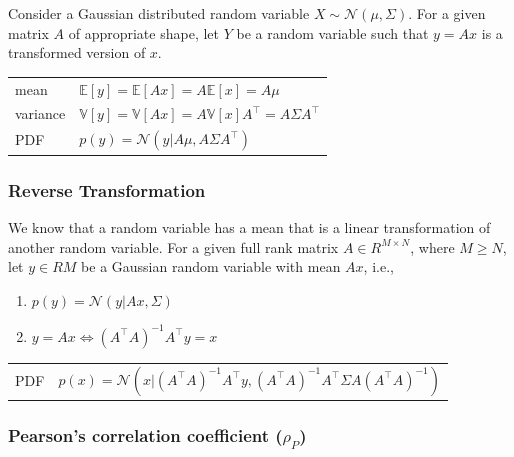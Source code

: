 Consider a Gaussian distributed random variable $X \sim \mathcal{N}(\mu , \Sigma )$. For a given matrix $A$ of appropriate shape, let $Y$ be a random variable such that $y = Ax$ is a transformed version of $x$.

\begin{table}[H]
    \begin{tabular}{l l}
        mean & $\mathbb{E}[y] = \mathbb{E}[Ax] = A\mathbb{E}[x] = A\mu $ \\

        variance & $\mathbb{V}[y] = \mathbb{V}[Ax] = A\mathbb{V}[x]A^\top  = A\Sigma A^\top $ \\

        PDF & $p(y) = \mathcal{N}(y|A\mu , A\Sigma A^\top )$ \\

    \end{tabular}
\end{table}


\subsubsection{Reverse Transformation}

We know that a random variable has a mean that is a linear transformation of another random variable. For a given full rank matrix $A \in R^{M\times N}$, where $M \geq N$, let $y \in RM$ be a Gaussian random variable with mean $Ax$, i.e., 

\begin{enumerate}[itemsep=0.3cm]
    \item $p(y) = \mathcal{N}(y|Ax, \Sigma )$

    \item $y = Ax \Leftrightarrow (A^\top A)^{-1} A^\top y = x$
\end{enumerate}

\begin{table}[H]
    \begin{tabular}{l l}
        PDF & $p(x) = \mathcal{N}(x|(A^\top A)^{-1} A^\top y, (A^\top A)^{-1} A^\top \Sigma A(A^\top A)^{-1} )$\\

        
    \end{tabular}
\end{table}


\subsubsection{Pearson’s correlation coefficient ($\rho_P$) \cite{ism-1}} \label{Normal distribution: Bivariate/ Multivariate: Pearson’s correlation coefficient}

